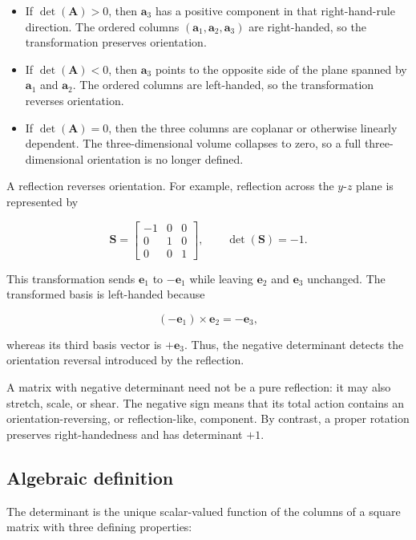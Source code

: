 \documentclass[
  australian,
  12pt,
  letterpaper,
  DIV=11,
  numbers=noendperiod,
  twoside]{scrreprt}
\providecommand{\tightlist}{%
  \setlength{\itemsep}{0pt}\setlength{\parskip}{0pt}}
\begin{document}
\begin{itemize}
\tightlist
\item
  If \(\det(\mathbf A)>0\), then \(\mathbf a_3\) has a positive
  component in that right-hand-rule direction. The ordered columns
  \((\mathbf a_1,\mathbf a_2,\mathbf a_3)\) are right-handed, so the
  transformation preserves orientation.
\item
  If \(\det(\mathbf A)<0\), then \(\mathbf a_3\) points to the opposite
  side of the plane spanned by \(\mathbf a_1\) and \(\mathbf a_2\). The
  ordered columns are left-handed, so the transformation reverses
  orientation.
\item
  If \(\det(\mathbf A)=0\), then the three columns are coplanar or
  otherwise linearly dependent. The three-dimensional volume collapses
  to zero, so a full three-dimensional orientation is no longer defined.
\end{itemize}

A reflection reverses orientation. For example, reflection across the
\(y\)-\(z\) plane is represented by

\[
\mathbf S
=
\begin{bmatrix}
-1&0&0\\
0&1&0\\
0&0&1
\end{bmatrix},
\qquad
\det(\mathbf S)=-1.
\]

This transformation sends \(\mathbf e_1\) to \(-\mathbf e_1\) while
leaving \(\mathbf e_2\) and \(\mathbf e_3\) unchanged. The transformed
basis is left-handed because

\[
(-\mathbf e_1)\times\mathbf e_2=-\mathbf e_3,
\]

whereas its third basis vector is \(+\mathbf e_3\). Thus, the negative
determinant detects the orientation reversal introduced by the
reflection.

A matrix with negative determinant need not be a pure reflection: it may
also stretch, scale, or shear. The negative sign means that its total
action contains an orientation-reversing, or reflection-like, component.
By contrast, a proper rotation preserves right-handedness and has
determinant \(+1\).

\subsection{Algebraic definition}\label{algebraic-definition}

The determinant is the unique scalar-valued function of the columns of a
square matrix with three defining properties:
\end{document}
